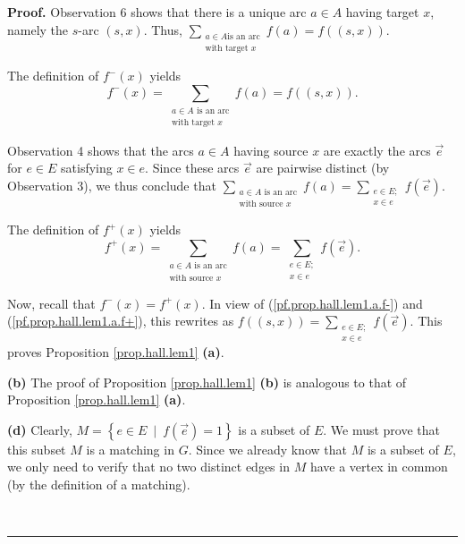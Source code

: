 \documentclass[numbers=enddot,12pt,final,onecolumn,notitlepage]{scrartcl}%
\theoremstyle{definition}
\newenvironment{proof}[1][Proof]{\noindent\textbf{#1.} }{\ \rule{0.5em}{0.5em}}
\let\sumnonlimits\sum
\renewcommand{\sum}{\sumnonlimits\limits}
\begin{document}
\begin{proof}
Observation 6 shows that there is a unique arc $a\in A$ having target $x$,
namely the $s$-arc $\left(  s,x\right)  $. Thus, $\sum_{\substack{a\in A\text{
is an arc}\\\text{with target }x}}f\left(  a\right)  =f\left(  \left(
s,x\right)  \right)  $.

The definition of $f^{-}\left(  x\right)  $ yields
\begin{equation}
f^{-}\left(  x\right)  =\sum_{\substack{a\in A\text{ is an arc}\\\text{with
target }x}}f\left(  a\right)  =f\left(  \left(  s,x\right)  \right)  .
\label{pf.prop.hall.lem1.a.f-}%
\end{equation}


Observation 4 shows that the arcs $a\in A$ having source $x$ are exactly the
arcs $\overrightarrow{e}$ for $e\in E$ satisfying $x\in e$. Since these arcs
$\overrightarrow{e}$ are pairwise distinct (by Observation 3), we thus
conclude that $\sum_{\substack{a\in A\text{ is an arc}\\\text{with source }%
x}}f\left(  a\right)  =\sum_{\substack{e\in E;\\x\in e}}f\left(
\overrightarrow{e}\right)  $.

The definition of $f^{+}\left(  x\right)  $ yields%
\begin{equation}
f^{+}\left(  x\right)  =\sum_{\substack{a\in A\text{ is an arc}\\\text{with
source }x}}f\left(  a\right)  =\sum_{\substack{e\in E;\\x\in e}}f\left(
\overrightarrow{e}\right)  . \label{pf.prop.hall.lem1.a.f+}%
\end{equation}


Now, recall that $f^{-}\left(  x\right)  =f^{+}\left(  x\right)  $. In view of
(\ref{pf.prop.hall.lem1.a.f-}) and (\ref{pf.prop.hall.lem1.a.f+}), this
rewrites as $f\left(  \left(  s,x\right)  \right)  =\sum_{\substack{e\in
E;\\x\in e}}f\left(  \overrightarrow{e}\right)  $. This proves Proposition
\ref{prop.hall.lem1} \textbf{(a)}.

\textbf{(b)} The proof of Proposition \ref{prop.hall.lem1} \textbf{(b)} is
analogous to that of Proposition \ref{prop.hall.lem1} \textbf{(a)}.

\textbf{(d)} Clearly, $M=\left\{  e\in E\ \mid\ f\left(  \overrightarrow{e}%
\right)  =1\right\}  $ is a subset of $E$. We must prove that this subset $M$
is a matching in $G$. Since we already know that $M$ is a subset of $E$, we
only need to verify that no two distinct edges in $M$ have a vertex in common
(by the definition of a matching).


\end{proof}
\end{document}
